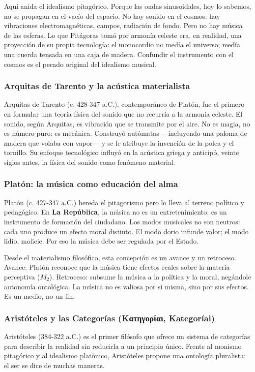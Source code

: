 \documentclass[14pt, a4paper]{article}
\begin{document}
Aquí anida el idealismo pitagórico. Porque las ondas sinusoidales,
hoy lo sabemos, no se propagan en el vacío del espacio. No hay sonido
en el cosmos: hay vibraciones electromagnéticas, campos, radiación de
fondo. Pero no hay música de las esferas. Lo que Pitágoras tomó por
armonía celeste era, en realidad, una proyección de su propia
tecnología: el monocordio no medía el universo; medía una cuerda
tensada en una caja de madera. Confundir el instrumento con el cosmos
es el pecado original del idealismo musical.
\subsubsection{Arquitas de Tarento y la acústica materialista}
\label{arquitas}
Arquitas de Tarento (c. 428-347 a.C.), contemporáneo de Platón, fue
el primero en formular una teoría física del sonido que no recurría a
la armonía celeste. El sonido, según Arquitas, es vibración que se
transmite por el aire. No es magia, no es número puro: es mecánica.
Construyó autómatas —incluyendo una paloma de madera que volaba con
vapor— y se le atribuye la invención de la polea y el tornillo. Su
enfoque tecnológico influyó en la acústica griega y anticipó, veinte
siglos antes, la física del sonido como fenómeno material.
\subsubsection{Platón: la música como educación del alma}
\label{platon-antecedentes}
Platón (c. 427-347 a.C.) hereda el pitagorismo pero lo lleva al
terreno político y pedagógico. En \textbf{La República}, la música no es un
entretenimiento: es un instrumento de formación del ciudadano. Los
modos musicales no son neutros: cada uno produce un efecto moral
distinto. El modo dorio infunde valor; el modo lidio, molicie. Por eso
la música debe ser regulada por el Estado.

Desde el materialismo filosófico, esta concepción es un avance y un
retroceso. Avance: Platón reconoce que la música tiene efectos reales
sobre la materia perceptiva (\(M_2\)). Retroceso: subsume la música a la
política y la moral, negándole autonomía ontológica. La música no es
valiosa por sí misma, sino por sus efectos. Es un medio, no un fin.
\subsubsection{Aristóteles y las Categorías (Κατηγορίαι, \textbf{Kategoríai})}
\label{aristoteles-categorias}
Aristóteles (384-322 a.C.) es el primer filósofo que ofrece un sistema
de categorías para describir la realidad sin reducirla a un principio
único. Frente al monismo pitagórico y al idealismo platónico,
Aristóteles propone una ontología pluralista: el ser se dice de muchas
maneras.
\end{document}

